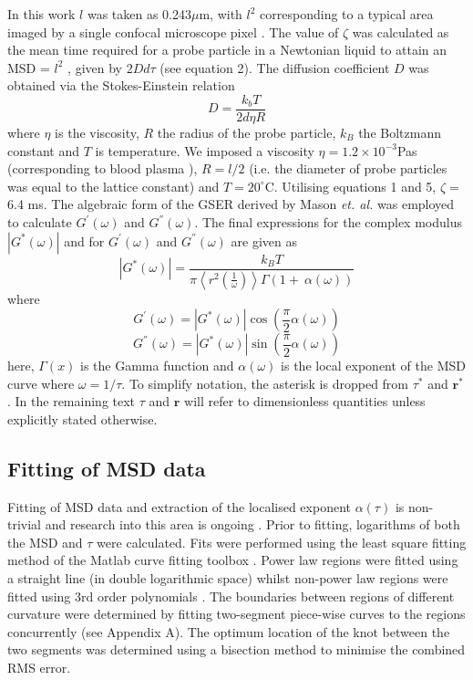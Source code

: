 \documentclass[%
 aip,
 amsmath,amssymb,
reprint, onecolumn %
]{revtex4-1}
\begin{document}
In this work $l$ was taken as 0.243$\mu$m, with $l^{2}$ corresponding to a typical area imaged by a single confocal microscope pixel \cite{Curtis2013}. The value of $\zeta$ was calculated as the mean time required for a probe particle in a Newtonian liquid to attain an MSD = $l^{2}$ \cite{Saxton1994}, given by $2Dd\tau$ (see equation 2). The diffusion coefficient $D$ was obtained via the Stokes-Einstein relation
\begin{equation}
D = \frac{k_{b}T}{2d\eta R}
\end{equation}
where $\eta$ is the viscosity, $R$ the radius of the probe particle, $k_{B}$ the Boltzmann constant and $T$ is temperature. We imposed a viscosity $\eta = 1.2 \times 10^{- 3}$Pas (corresponding to blood plasma \cite{Hajjarian2015}), $R = l/2$ (i.e. the diameter of probe particles was equal to the lattice constant) and $T = 20^{\circ}$C. Utilising equations 1 and 5, $\zeta =$ 6.4 ms. The algebraic form of the GSER derived by Mason \textit{et. al.} \cite{Mason1995,Mason2000,Mason1997} was employed to calculate $G^{'}(\omega)$ and $G^{''}(\omega)$. The final expressions for the complex modulus $|G^{*}(\omega)|$ and for $G^{'}(\omega)$ and $G^{''}(\omega)$ are given as
\begin{equation}
\left| G^{*}(\omega) \right| = \frac{k_{B}T}{\pi\left\langle r^{2}\left( \frac{1}{\omega} \right) \right\rangle\Gamma(1 + \ \alpha(\omega))}
\end{equation}
where
\begin{equation}
G^{'}(\omega) = \left| G^{*}(\omega) \right|\cos\left( \frac{\pi}{2}\alpha(\omega) \right)
\end{equation}
\begin{equation}
G^{''}(\omega) = \left| G^{*}(\omega) \right|\sin\left( \frac{\pi}{2}\alpha(\omega) \right)
\end{equation}
here, $\Gamma(x)$ is the Gamma function and $\alpha(\omega)$ is the local exponent of the MSD curve where $\omega = 1/\tau$. To simplify notation, the asterisk is dropped from $\tau^{*}$ and $\mathbf{r}^{*}$. In the remaining text $\tau$ and $\mathbf{r}$ will refer to dimensionless quantities unless explicitly stated otherwise.

\subsection{Fitting of MSD data}

Fitting of MSD data and extraction of the localised exponent $\alpha(\tau)$ is non-trivial and research into this area is ongoing \cite{Wu2008,Nandi2012,Kepten2015}. Prior to fitting, logarithms of both the MSD and $\tau$ were calculated. Fits were performed using the least square fitting method of the Matlab curve fitting toolbox \cite{Mathworks2023}. Power law regions were fitted using a straight line (in double logarithmic space) whilst non-power law regions were fitted using 3rd order polynomials \cite{deBruyn2013}. The boundaries between regions of different curvature were determined by fitting two-segment piece-wise curves to the regions concurrently (see Appendix A). The optimum location of the knot between the two segments was determined using a bisection method to minimise the combined RMS error. 
\end{document}
